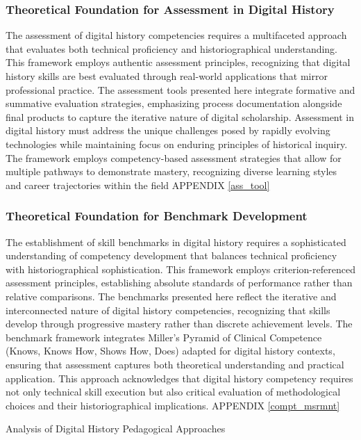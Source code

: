 \subsubsection{Theoretical Foundation for Assessment in Digital History}

The assessment of digital history competencies requires a multifaceted approach that evaluates both technical proficiency and historiographical understanding. This framework employs authentic assessment principles, recognizing that digital history skills are best evaluated through real-world applications that mirror professional practice. The assessment tools presented here integrate formative and summative evaluation strategies, emphasizing process documentation alongside final products to capture the iterative nature of digital scholarship.
Assessment in digital history must address the unique challenges posed by rapidly evolving technologies while maintaining focus on enduring principles of historical inquiry. The framework employs competency-based assessment strategies that allow for multiple pathways to demonstrate mastery, recognizing diverse learning styles and career trajectories within the field
APPENDIX \ref{ass_tool}

\subsubsection{Theoretical Foundation for Benchmark Development}

The establishment of skill benchmarks in digital history requires a sophisticated understanding of competency development that balances technical proficiency with historiographical sophistication. This framework employs criterion-referenced assessment principles, establishing absolute standards of performance rather than relative comparisons. The benchmarks presented here reflect the iterative and interconnected nature of digital history competencies, recognizing that skills develop through progressive mastery rather than discrete achievement levels.
The benchmark framework integrates Miller's Pyramid of Clinical Competence (Knows, Knows How, Shows How, Does) adapted for digital history contexts, ensuring that assessment captures both theoretical understanding and practical application. This approach acknowledges that digital history competency requires not only technical skill execution but also critical evaluation of methodological choices and their historiographical implications.
APPENDIX \ref{compt_msrmnt}

 Analysis of Digital History Pedagogical Approaches


